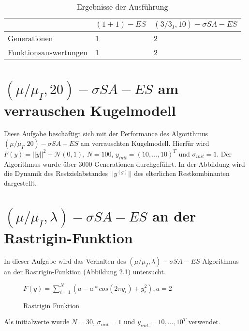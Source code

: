 \begin{table}[h]
  \begin{center}
  \begin{tabular}{|l|p{5cm}|p{5cm}|}
    \hline
     & $(1+1)-ES$ & $(3/3_I,10)-\sigma SA-ES$ \\
    \hline
    Generationen & 1 & 2 \\
    \hline
    Funktionsauswertungen & 1 & 2 \\
    \hline
  \end{tabular}
  \caption{Ergebnisse der Ausführung}
  \end{center}
\end{table}


\chapter{$(\mu/\mu_I,20)-\sigma SA-ES$ am verrauschen Kugelmodell}

Diese Aufgabe beschäftigt sich mit der Performance des Algorithmus $(\mu/\mu_I,20)-\sigma SA-ES$ am verrauschten Kugelmodell. Hierfür wird $F(y)=||y||^2+\mathcal{N}(0,1)$, $N=100$, $y_{init}=(10,...,10)^T$ und $\sigma_{init}=1$.
Der Algorithmus wurde über 3000 Generationen durchgeführt. In der Abbildung  wird die Dynamik des Restzielabstandes $||y^{(g)}||$ des elterlichen Restkombinanten dargestellt.


\chapter{$(\mu/\mu_I,\lambda)-\sigma SA-ES$ an der Rastrigin-Funktion}

In dieser Aufgabe wird das Verhalten des $(\mu/\mu_I,\lambda)-\sigma SA-ES$ Algorithmus an der Rastrigin-Funktion (Abbildung \ref{fig:rastrigin}) untersucht.

\begin{figure}[h]
  \label{fig:rastrigin}
  \begin{center}
  
    $F(y)=\sum_{i=1}^N(a-a*cos(2\pi y_i)+y_i^2), a=2$
    
    \caption{Rastrigin Funktion}
  \end{center}
\end{figure}

Als initialwerte wurde $N=30$, $\sigma_{init}=1$ und $y_{init}={10,...,10}^T$ verwendet.


